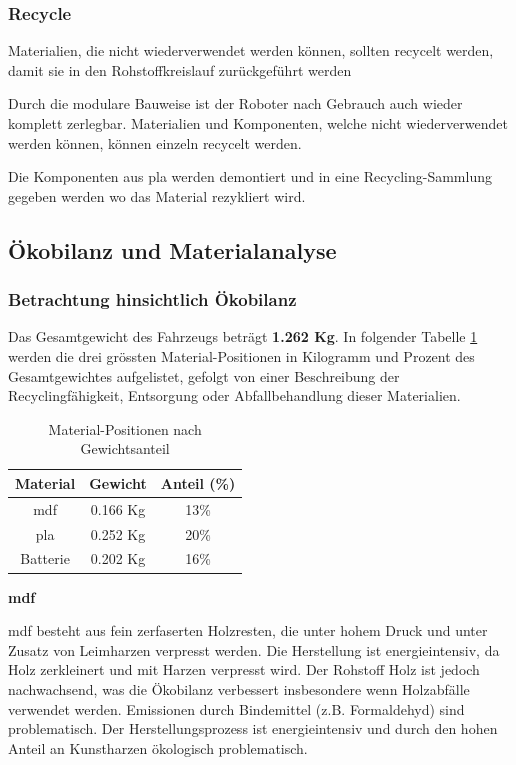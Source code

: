 \subsubsection{Recycle}

Materialien, die nicht wiederverwendet werden können, sollten
recycelt werden, damit sie in den Rohstoffkreislauf zurückgeführt werden

Durch die modulare Bauweise ist der Roboter nach Gebrauch auch wieder komplett zerlegbar. Materialien und Komponenten, welche nicht wiederverwendet werden können, können einzeln recycelt werden.

Die Komponenten aus \acrshort{pla} werden demontiert und in eine Recycling-Sammlung gegeben werden wo das Material rezykliert wird.


\subsection{Ökobilanz und Materialanalyse}

\subsubsection{Betrachtung hinsichtlich Ökobilanz}
Das Gesamtgewicht des Fahrzeugs beträgt \textbf{1.262 Kg}. In folgender Tabelle \ref{tab:kritische-mat} werden die drei grössten Material-Positionen in Kilogramm und Prozent des Gesamtgewichtes aufgelistet, gefolgt von einer Beschreibung der Recyclingfähigkeit, Entsorgung oder Abfallbehandlung dieser Materialien.

\begin{table}[H]
    \centering
    \begin{tabular}{c c c}
    \toprule
    Material & Gewicht  & Anteil (\%)\\
    \midrule
    \acrshort{mdf} & 0.166 Kg & 13\% \\
    \acrshort{pla} & 0.252 Kg & 20\% \\
    Batterie & 0.202 Kg & 16\%   \\
    \bottomrule
    \end{tabular}
    \caption{Material-Positionen nach Gewichtsanteil}
    \label{tab:kritische-mat}
\end{table}


\textbf{\acrfull{mdf}}

\acrshort{mdf} besteht aus fein zerfaserten Holzresten, die unter hohem Druck und unter Zusatz von Leimharzen verpresst werden. Die Herstellung ist energieintensiv, da Holz zerkleinert und mit Harzen verpresst wird. Der Rohstoff Holz ist jedoch nachwachsend, was die Ökobilanz verbessert insbesondere wenn Holzabfälle verwendet werden. Emissionen durch Bindemittel (z.B. Formaldehyd) sind problematisch.\cite{support-2024}
Der Herstellungsprozess ist energieintensiv und durch den hohen Anteil an Kunstharzen ökologisch problematisch.

